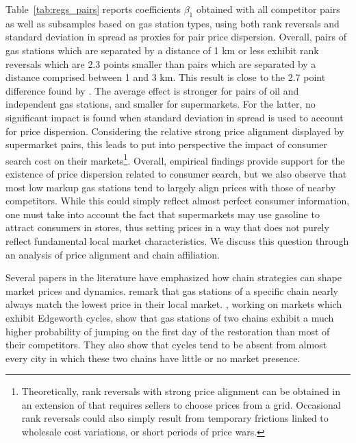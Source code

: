 \documentclass[english]{article}
\begin{document}
Table~\ref{tab:regs_pairs} reports coefficients $\beta_1$ obtained with all competitor pairs as well as subsamples based on gas station types, using both rank reversals and standard deviation in spread as proxies for pair price dispersion. Overall, pairs of gas stations which are separated by a distance of 1 km or less exhibit rank reversals which are 2.3 points smaller than pairs which are separated by a distance comprised between 1 and 3 km. This result is close to the 2.7 point difference found by \cite{TAP11}. The average effect is stronger for pairs of oil and independent gas stations, and smaller for supermarkets. For the latter, no significant impact is found when standard deviation in spread is used to account for price dispersion. Considering the relative strong price alignment displayed by supermarket pairs, this leads to put into perspective the impact of consumer search cost on their markets\footnote{Theoretically, rank reversals with strong price alignment can be obtained in an extension of \cite{VAR80} that requires sellers to choose prices from a grid. Occasional rank reversals could also simply result from temporary frictions linked to wholesale cost variations, or short periods of price wars.}. Overall, empirical findings provide support for the existence of price dispersion related to consumer search, but we also observe that most low markup gas stations tend to largely align prices with those of nearby competitors. While this could simply reflect almost perfect consumer information, one must take into account the fact that supermarkets may use gasoline to attract consumers in stores, thus setting prices in a way that does not purely reflect fundamental local market characteristics. We discuss this question through an analysis of price alignment and chain affiliation.

Several papers in the literature have emphasized how chain strategies can shape market prices and dynamics. \cite{HOS08} remark that gas stations of a specific chain nearly always match the lowest price in their local market. \cite{LEW12}, working on markets which exhibit Edgeworth cycles, show that gas stations of two chains exhibit a much higher probability of jumping on the first day of the restoration than most of their competitors. They also show that cycles tend to be absent from almost every city in which these two chains have little or no market presence.
\end{document}
